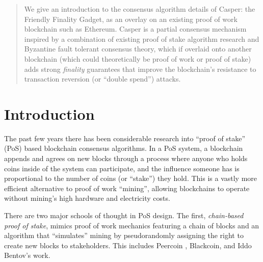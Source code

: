\documentclass[12pt]{article}
\begin{document}
\maketitle


\begin{abstract}
We give an introduction to the consensus algorithm details of Casper: the Friendly Finality Gadget, as an overlay on an existing proof of work blockchain such as Ethereum. Casper is a partial consensus mechanism inspired by a combination of existing proof of stake algorithm research and Byzantine fault tolerant consensus theory, which if overlaid onto another blockchain (which could theoretically be proof of work or proof of stake) adds strong \textit{finality} guarantees that improve the blockchain's resistance to transaction reversion (or ``double spend'') attacks.
\end{abstract}

\section{Introduction}
\label{sect:intro}

The past few years there has been considerable research into ``proof of stake'' (PoS) based blockchain consensus algorithms. In a PoS system, a blockchain appends and agrees on new blocks through a process where anyone who holds coins inside of the system can participate, and the influence someone has is proportional to the number of coins (or ``stake'') they hold. This is a vastly more efficient alternative to proof of work ``mining'', allowing blockchains to operate without mining's high hardware and electricity costs.

There are two major schools of thought in PoS design. The first, \textit{chain-based proof of stake}, mimics proof of work mechanics featuring a chain of blocks and an algorithm that ``simulates'' mining by pseudorandomly assigning the right to create new blocks to stakeholders.  This includes Peercoin \cite{king2012ppcoin}, Blackcoin\cite{vasin2014blackcoin}, and Iddo Bentov's work\cite{bentov2016pos}.
\end{document}
